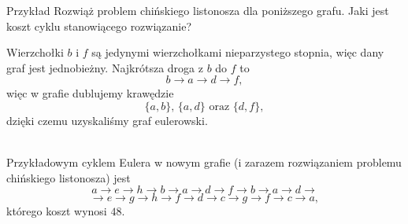 \documentclass[a4paper,10pt]{beamer}
\begin{document}
\begin{frame}
	
	\begin{exampleblock}{Przykład}
Rozwiąż problem chińskiego listonosza dla poniższego grafu. Jaki jest koszt cyklu stanowiącego rozwiązanie?

		\begin{minipage}{.4\textwidth}
			\begin{center}
			\end{center}
		\end{minipage}
		\begin{minipage}{.55\textwidth}
			Wierzchołki $b$ i $f$ są jedynymi wierzchołkami nieparzystego stopnia, więc dany graf jest jednobieżny. Najkrótsza droga z $b$ do $f$ to $$b\to a\to d\to f,$$ więc w grafie dublujemy krawędzie $$\{a,b\},\,\{a,d\}\mbox{ oraz }\{d,f\},$$ dzięki czemu uzyskaliśmy graf eulerowski.
		\end{minipage}\\
	\vspace{0.3cm}
Przykładowym cyklem Eulera w nowym grafie (i zarazem rozwiązaniem problemu chińskiego listonosza) jest
$$a\to e\to h\to b\to a\to d\to f\to b\to a\to d\to$$
$$\to e\to g\to h\to f\to d\to c\to g\to f\to c\to a,$$
którego koszt wynosi $48$.
	\end{exampleblock}
\end{frame}
\end{document}
